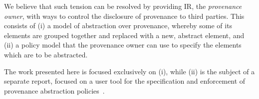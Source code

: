 %
We believe that such tension can be resolved by providing IR, the \textit{provenance owner}, with ways to control the disclosure of provenance to third parties. This consists of (i) a model of abstraction over provenance, whereby some of its elements are grouped together and replaced with a new, abstract element, and (ii) a policy model that the provenance owner can use to specify the  elements which are to be abstracted.
%

The work presented here is focused exclusively on (i), while (ii)  is the subject of a separate report, focused on a user tool for the specification and enforcement of provenance abstraction policies~\citep{MBGCD14}.  
%
%






%

